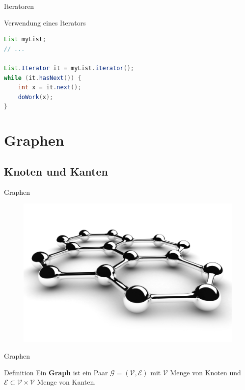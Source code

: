 \documentclass[18pt]{beamer}
\begin{document}
\begin{frame}[fragile]{Iteratoren}

    \begin{exampleblock}{Verwendung eines Iterators}
        \begin{lstlisting}[language=Java,basicstyle=\scriptsize]
List myList;
// ...

List.Iterator it = myList.iterator();
while (it.hasNext()) {
    int x = it.next();
    doWork(x);
}
        \end{lstlisting}

    \end{exampleblock}


\end{frame}

\section{Graphen}

\subsection{Knoten und Kanten}

\begin{frame}{Graphen}
    \begin{figure}
        \includegraphics[scale=2.5]{img/graph.jpg}
    \end{figure}
\end{frame}

\begin{frame}{Graphen}
    \begin{block}{Definition}
        Ein \textbf{Graph} ist ein Paar $\mathcal{G} = (\mathcal{V}, \mathcal{E})$
        mit $\mathcal{V}$ Menge von Knoten
        und $\mathcal{E} \subset \mathcal{V} \times \mathcal{V}$ Menge von Kanten.
    \end{block}

\end{frame}
\end{document}
